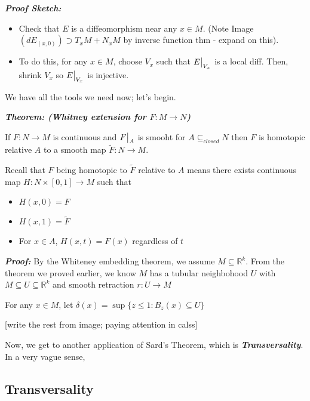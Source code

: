 \documentclass{article}
\newcommand{\R}{\mathbb{R}}
\newcommand{\restr}[2]{{%
  \left.\kern-\nulldelimiterspace %
  #1 %
  \vphantom{\big|} %
  \right|_{#2} %
  }}
\begin{document}
\emph{\textbf{Proof Sketch:}} 
\begin{itemize}
  \item Check that $E$ is a diffeomorphism near any $x \in M$. (Note Image$(dE_{(x,0)}) \supset T_xM + N_xM$ by inverse function thm - expand on this).
  \item To do this, for any $x \in M$, choose $V_x$ such that $\restr{E}{V_x}$ is a local diff. Then, shrink $V_x$ so $\restr{E}{V_x}$ is injective.
\end{itemize}

\vskip 1cm
We have all the tools we need now; let's begin.

\vskip 0.5cm
\begin{dottedbox}
  \textbf{\emph{Theorem: (Whitney extension for $F : M \rightarrow N$)}} 

  If $F : N \rightarrow M$ is continuous and $\restr{F}{A}$ is smooht for $A \subseteq_{closed} N$ then $F$ is homotopic relative $A$ to a smooth map $\tilde{F} : N \rightarrow M$.

  \vskip 0.5cm
  Recall that $F$ being homotopic to $\tilde{F}$ relative to $A$ means there exists continuous map $H : N \times [0,1] \rightarrow M$ such that 
  \begin{itemize}
    \item $H(x, 0) = F$
    \item $H(x, 1) = \tilde{F}$
    \item For $x \in A$, $H(x, t) = F(x)$ regardless of $t$
  \end{itemize}
\end{dottedbox}


\vskip 0.5cm
\emph{\textbf{Proof:}} By the Whiteney embedding theorem, we assume $M \subseteq \R^k$. From the theorem we proved earlier, we know $M$ has a tubular neighbohood $U$ with $M \subseteq U \subseteq \R^k$ and smooth retraction $r : U \rightarrow M$

\vskip 0.5cm
For any $x \in M$, let $\delta(x) = \sup\{ z \leq 1 : B_z(x) \subseteq U \}$

[write the rest from image; paying attention in calss]

\vskip 0.5cm
Now, we get to another application of Sard's Theorem, which is \emph{\textbf{Transversality}}. In a very vague sense, 

\subsection{Transversality}
\end{document}
